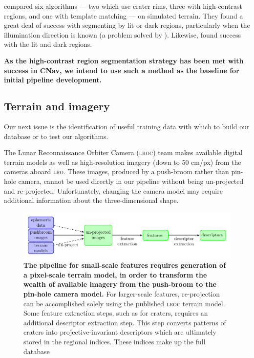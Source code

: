 \documentclass[12pt]{article}
\begin{document}
\citet{Woicke2018} compared six algorithms --- two which use crater rims, three with high-contrast regions, and one with template matching --- on simulated terrain. They found a great deal of success with segmenting by lit or dark regions, particularly when the illumination direction is known (a problem solved by \citet{Maass2016}). Likewise, \citet{Maass2020} found success with the lit and dark regions.

\textbf{As the high-contrast region segmentation strategy has been met with success in CNav, we intend to use such a method as the baseline for initial pipeline development.}

\subsection{Terrain and imagery}
Our next issue is the identification of useful training data with which to build our database or to test our algorithms.

The Lunar Reconnaissance Orbiter Camera (\textsc{lroc}) team makes available digital terrain models as well as high-resolution imagery (down to 50 cm/px) from the cameras aboard \textsc{lro}. These images, produced by a push-broom rather than pin-hole camera, cannot be used directly in our pipeline without being un-projected and re-projected. Unfortunately, changing the camera model may require additional information about the three-dimensional shape.

\begin{figure}
\includegraphics[width=\textwidth]{pipeline.pdf}
\caption{\label{fig:pipeline}\textbf{The pipeline for small-scale features requires generation of a pixel-scale terrain model, in order to transform the wealth of available imagery from the push-broom to the pin-hole camera model.} For larger-scale features, re-projection can be accomplished solely using the published \textsc{lroc} terrain model. Some feature extraction steps, such as for craters, requires an additional descriptor extraction step. This step converts patterns of craters into projective-invariant descriptors which are ultimately stored in the regional indices. These indices make up the full database}
\end{figure}
\end{document}
